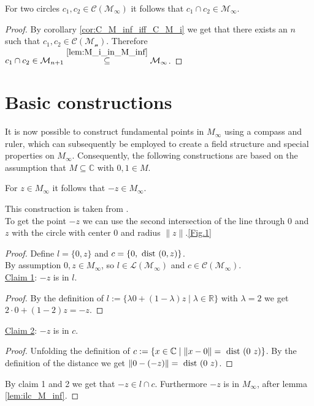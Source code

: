 \begin{lemma}
    \label{lem:icc_M_inf}
    \leanok
    For two circles $c_1, c_2 \in \mathcal{C(M_{\infty})}$ it follows that $c_1 \cap c_2 \in \mathcal{M}_{\infty}$.
\end{lemma}
\begin{proof}
    \leanok
    By corollary \ref{cor:C_M_inf_iff_C_M_i} we get that there exists an $n$ such that $c_1, c_2 \in \mathcal{C(M_n)}$.
    Therefore $c_1 \cap c_2 \in \mathcal{M}_{n+1} \stackrel{\ref{lem:M_i_in_M_inf}}{\subseteq} \mathcal{M}_{\infty}$.
\end{proof}


\section{Basic constructions}\label{basic_constructions}
It is now possible to construct fundamental points in $M_{\infty}$ using a compass and ruler, which can subsequently be employed to create a field structure and special properties on $M_{\infty}$. 
Consequently, the following constructions are based on the assumption that $M\subseteq \mathbb{C}$ with $0,1 \in M$.
\begin{lemma}
    \label{lem:construction_neg}
    \leanok
    For $z \in M_{\infty}$ it follows that $-z \in M_{\infty}$.
\end{lemma}
This construction is taken from \cite{JAN_SCHRÖER:2023}.\\
To get the point $-z$ we can use the second intersection of the line through $0$ and $z$ with the circle with center $0$ and radius $\|z\|$.\ref{Fig.1}

\begin{proof}
    \leanok
    Define $l = \{0,z\}$ and $c = \{0,\text{ dist } (0, z)\}$.\\
    By assumption $0, z \in M_{\infty}$, so $l \in \mathcal{L(M_{\infty})}$ and $c \in \mathcal{C(M_{\infty})}$.\\
    \underline{Claim 1}: $-z$ is in $l$.
    \begin{proof}
        By the definition of $l:=\{\lambda 0+(1-\lambda)z\mid\lambda\in\mathbb{R}\}$ with $\lambda = 2$ we get $2 \cdot 0 + (1-2)z = -z$.
    \end{proof}
    \underline{Claim 2}: $-z$ is in $c$.
    \begin{proof}
        Unfolding the definition of $c:=\{x\in\mathbb{C} \mid\|x-0\|=\dist (0\ z)\}$.
        By the definition of the distance we get $\|0-(-z)\| = \text{ dist } (0\ z)$.
    \end{proof}
    By claim 1 and 2 we get that $-z \in l \cap c$. Furthermore  $-z $ is in $M_{\infty}$, after lemma \ref{lem:ilc_M_inf}.
\end{proof}

